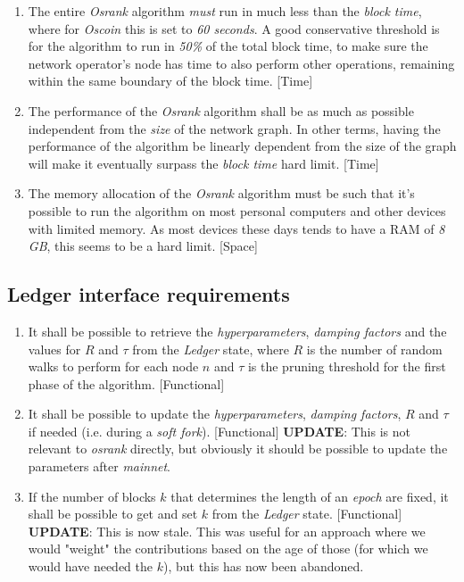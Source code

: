 \documentclass{article}
\begin{document}
\begin{enumerate}
\item The entire \textit{Osrank} algorithm \textit{must} run in
      much less than the \textit{block time}, where for
      \textit{Oscoin} this is set to \textit{60 seconds}.
      A good conservative threshold is for the algorithm to run
      in \textit{50\%} of the total block time, to make sure the
      network operator's node has time to also perform other
      operations, remaining within the same boundary of the
      block time. [Time]
\item The performance of the \textit{Osrank} algorithm shall be
      as much as possible independent from the \textit{size} of the
      network graph. In other terms, having the performance of the
      algorithm be linearly dependent from the size of the graph will
      make it eventually surpass the \textit{block time} hard limit. [Time]
\item The memory allocation of the \textit{Osrank} algorithm must be
      such that it's possible to run the algorithm on most personal
      computers and other devices with limited memory. As most devices
      these days tends to have a RAM of \textit{8 GB}, this seems to be
      a hard limit. [Space]
\end{enumerate}

\subsection{Ledger interface requirements}

\begin{enumerate}
\item It shall be possible to retrieve the
      \textit{hyperparameters}, \textit{damping factors} and
      the values for $R$ and $\tau$ from the
      \textit{Ledger} state, where $R$ is the number
      of random walks to perform for each node $n$ and
      $\tau$ is the pruning threshold for the first
      phase of the algorithm. [Functional]
\item It shall be possible to update the
      \textit{hyperparameters}, \textit{damping factors},
      $R$ and $\tau$ if needed
      (i.e. during a \textit{soft fork}). [Functional]
      \textbf{UPDATE}: This is not relevant to \textit{osrank} directly,
      but obviously it should be possible to update the parameters after
      \textit{mainnet}.
\item If the number of blocks $k$ that determines the length of
      an \textit{epoch} are fixed, it shall be possible to
      get and set $k$ from the \textit{Ledger} state. [Functional]
      \textbf{UPDATE}: This is now stale. This was useful for an approach
      where we would "weight" the contributions based on the age of
      those (for which we would have needed the $k$), but this has
      now been abandoned.
\end{enumerate}
\end{document}
